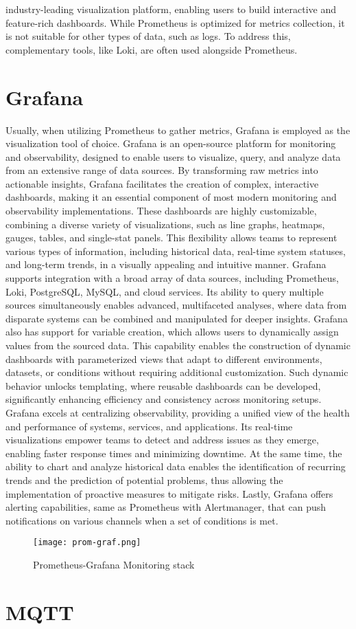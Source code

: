industry-leading visualization platform, enabling users to build interactive and feature-rich dashboards. While Prometheus is optimized for metrics collection, it is not suitable for other types of data, such as logs. To address this, complementary tools, like Loki, are often used alongside Prometheus\cite{Jani2024-mg,Pragathi2024-fa}.

\section{Grafana}
Usually, when utilizing Prometheus to gather metrics, Grafana is employed as the visualization tool of choice. Grafana is an open-source platform for monitoring and observability, designed to enable users to visualize, query, and analyze data from an extensive range of data sources. By transforming raw metrics into actionable insights, Grafana facilitates the creation of complex, interactive dashboards, making it an essential component of most modern monitoring and observability implementations. These dashboards are highly customizable, combining a diverse variety of visualizations, such as line graphs, heatmaps, gauges, tables, and single-stat panels. This flexibility allows teams to represent various types of information, including historical data, real-time system statuses, and long-term trends, in a visually appealing and intuitive manner. Grafana supports integration with a broad array of data sources, including Prometheus, Loki, PostgreSQL, MySQL, and cloud services. Its ability to query multiple sources simultaneously enables advanced, multifaceted analyses, where data from disparate systems can be combined and manipulated for deeper insights. Grafana also has support for variable creation, which allows users to dynamically assign values from the sourced data. This capability enables the construction of dynamic dashboards with parameterized views that adapt to different environments, datasets, or conditions without requiring additional customization. Such dynamic behavior unlocks templating, where reusable dashboards can be developed, significantly enhancing efficiency and consistency across monitoring setups. Grafana excels at centralizing observability, providing a unified view of the health and performance of systems, services, and applications. Its real-time visualizations empower teams to detect and address issues as they emerge, enabling faster response times and minimizing downtime. At the same time, the ability to chart and analyze historical data enables the identification of recurring trends and the prediction of potential problems, thus allowing the implementation of proactive measures to mitigate risks. Lastly, Grafana offers alerting capabilities, same as Prometheus with Alertmanager, that can push notifications on various channels when a set of conditions is met\cite{grafana, promandgraf}.

\begin{figure}[!h]
    \graphicspath{ {./diagrams/} }
    \texttt{[image: prom-graf.png]}
    \centering
    \caption{Prometheus-Grafana Monitoring stack}
    \label{fig:prom_graf}
\end{figure}

\section{MQTT}